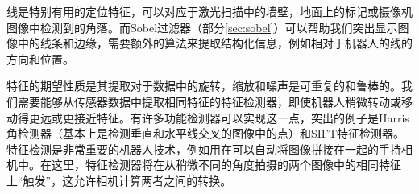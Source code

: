



线是特别有用的定位特征，可以对应于激光扫描中的墙壁，地面上的标记或摄像机图像中检测到的角落。而Sobel过滤器（部分\ref{sec:sobel}）可以帮助我们突出显示图像中的线条和边缘，需要额外的算法来提取结构化信息，例如相对于机器人的线的方向和位置。

特征的期望性质是其提取对于数据中的旋转，缩放和噪声是可重复的和鲁棒的。我们需要能够从传感器数据中提取相同特征的特征检测器，即使机器人稍微转动或移动得更远或更接近特征。有许多功能检测器可以实现这一点，突出的例子是Harris角检测器（基本上是检测垂直和水平线交叉的图像中的点）和SIFT特征检测器。特征检测是非常重要的机器人技术，例如用在可以自动将图像拼接在一起的手持相机中。在这里，特征检测器将在从稍微不同的角度拍摄的两个图像中的相同特征上“触发”，这允许相机计算两者之间的转换。


